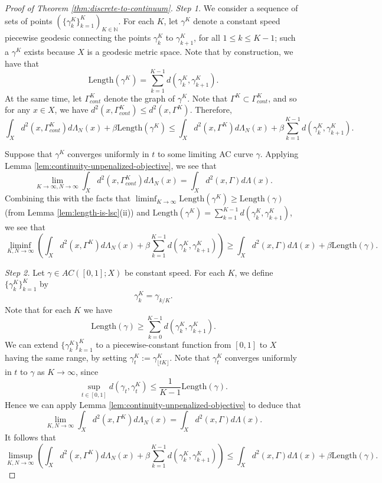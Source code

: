 \documentclass[aos, preprint]{imsart}
\theoremstyle{plain}
\theoremstyle{remark}
\begin{document}
\begin{appendix}
\begin{proof}[Proof of Theorem \ref{thm:discrete-to-continuum}]
  \emph{Step 1.} We consider a sequence of sets of points
  $(\{\gamma_{k}^{K}\}_{k=1}^{K})_{K\in\mathbb{N}}$. For each $K$, let
  $\gamma^{K}$ denote a constant speed piecewise geodesic connecting
  the points $\gamma_{k}^K$ to $\gamma_{k+1}^K$, for all $1\leq k\leq
  K-1$; such a $\gamma^{K}$ exists because $X$ is a geodesic metric
  space. Note that by construction, we have that
\[
\text{Length}(\gamma^{K})=\sum_{k=1}^{K-1}d(\gamma_{k}^{K},\gamma_{k+1}^{K}).
\]
At the same time, let $\Gamma_{cont}^{K}$ denote the graph of $\gamma^{K}$.
Note that $\Gamma^{K}\subset\Gamma_{cont}^{K}$, and so for any $x\in X$,
we have $d^{2}(x,\Gamma_{cont}^{K})\leq d^{2}(x,\Gamma^{K})$. Therefore,
\[
\int_{X}d^{2}(x,\Gamma_{cont}^{K})d\Lambda_{N}(x)+\beta\text{Length}(\gamma^{K})\leq\int_{X}d^{2}(x,\Gamma^{K})d\Lambda_{N}(x)+\beta\sum_{k=1}^{K-1}d(\gamma_{k}^{K},\gamma_{k+1}^{K}).
\]

Suppose that $\gamma^{K}$ converges uniformly in $t$ to some limiting
AC curve $\gamma$. Applying Lemma \ref{lem:continuity-unpenalized-objective},
we see that
\[
\lim_{K\rightarrow\infty,N\rightarrow\infty}\int_{X}d^{2}(x,\Gamma_{cont}^{K})d\Lambda_{N}(x)=\int_{X}d^{2}(x,\Gamma)d\Lambda(x).
\]
Combining this with the facts that
$\liminf_{K\rightarrow\infty}\text{Length}(\gamma^{K})\geq\text{Length}(\gamma)$
(from Lemma \ref{lem:length-is-lsc}(ii)) and
$\text{Length}(\gamma^{K})=\sum_{k=1}^{K-1}d(\gamma_{k}^{K},\gamma_{k+1}^{K})$,
we see that
\[
\liminf_{K,N\rightarrow\infty}\left(\int_{X}d^{2}(x,\Gamma^{K})d\Lambda_{N}(x)+\beta\sum_{k=1}^{K-1}d(\gamma_{k}^{K},\gamma_{k+1}^{K})\right)\geq\int_{X}d^{2}(x,\Gamma)d\Lambda(x)+\beta\text{Length}(\gamma).
\]

\emph{Step 2.} Let $\gamma\in AC([0,1];X)$ be constant speed. For
each $K$, we define $\{\gamma_{k}^{K}\}_{k=1}^{K}$ by
\[
\gamma_{k}^{K}=\gamma_{k/K}.
\]
 Note that for each $K$ we have
\[
\text{Length}(\gamma)\geq\sum_{k=0}^{K-1}d(\gamma_{k}^{K},\gamma_{k+1}^{K}).
\]
We can extend $\{\gamma_{k}^{K}\}_{k=1}^{K}$ to a piecewise-constant
function from $[0,1]$ to $X$ having the same range, by setting $\gamma_{t}^{K}:=\gamma_{\lfloor tK\rfloor}^{K}$.
Note that $\gamma_{t}^{K}$ converges uniformly in $t$ to $\gamma$
as $K\rightarrow\infty$, since
\[
\sup_{t\in[0,1]}d(\gamma_{t},\gamma_{t}^{K})\leq\frac{1}{K-1}\text{Length}(\gamma).
\]
Hence we can apply Lemma \ref{lem:continuity-unpenalized-objective}
to deduce that
\[
\lim_{K,N\rightarrow\infty}\int_{X}d^{2}(x,\Gamma^{K})d\Lambda_{N}(x)=\int_{X}d^{2}(x,\Gamma)d\Lambda(x).
\]
It follows that
\[
\limsup_{K,N\rightarrow\infty}\left(\int_{X}d^{2}(x,\Gamma^{K})d\Lambda_{N}(x)+\beta\sum_{k=1}^{K-1}d(\gamma_{k}^{K},\gamma_{k+1}^{K})\right)\leq\int_{X}d^{2}(x,\Gamma)d\Lambda(x)+\beta\text{Length}(\gamma).
\]


\end{proof}
\end{appendix}
\end{document}
